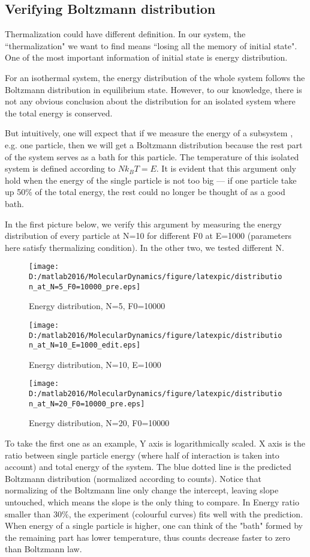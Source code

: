 \documentclass[aps,pre,twocolumn
,groupedaddress]{revtex4-1}
\begin{document}
\subsection{Verifying Boltzmann distribution}
Thermalization could have different definition. In our system, the ``thermalization" we want to find means ``losing all the memory of initial state". One of the most important information of initial state is energy distribution. 
 
For an isothermal system, the energy distribution of the whole system follows the Boltzmann distribution in equilibrium state. However, to our knowledge, there is not any obvious conclusion about the distribution for an isolated system where the total energy is conserved.

But intuitively, one will expect that if we measure the energy of a subsystem , e.g. one particle, then we will get a Boltzmann distribution because the rest part of the system serves as a bath for this particle. The temperature of this isolated system is defined according to $Nk_BT=E$. It is evident that this argument only hold when the energy of the single particle is not too big --- if one particle take up 50\% of the total energy, the rest could no longer be thought of as a good bath.

In the first picture below, we verify this argument by measuring the energy distribution of every particle at N=10 for different F0 at E=1000 (parameters here satisfy thermalizing condition). In the other two, we tested different N.

\newpage
\begin{figure}[hbtp]
\centering
\texttt{[image: D:/matlab2016/MolecularDynamics/figure/latexpic/distribution\_at\_N=5\_F0=10000\_pre.eps]}
\caption{Energy distribution, N=5, F0=10000}
\label{fig:thermalization8}

\texttt{[image: D:/matlab2016/MolecularDynamics/figure/latexpic/distribution\_at\_N=10\_E=1000\_edit.eps]}
\caption{Energy distribution, N=10, E=1000 {\color{red}{Run with N=10 F0=10000 to substitute this one}} }
\label{fig:thermalization9}

\texttt{[image: D:/matlab2016/MolecularDynamics/figure/latexpic/distribution\_at\_N=20\_F0=10000\_pre.eps]} 
\caption{Energy distribution, N=20, F0=10000}
\label{fig:thermalization10}
\end{figure}



To take the first one as an example, Y axis is logarithmically scaled. X axis is the ratio between single particle energy (where half of interaction is taken into account) and total energy of the system. The blue dotted line is the predicted Boltzmann distribution (normalized according to counts). Notice that normalizing of the Boltzmann line only change the intercept, leaving slope untouched, which means the slope is the only thing to compare. In  Energy ratio smaller than 30\%, the experiment (colourful curves) fits well with the prediction. When energy of a single particle is higher, one can think of the "bath" formed by the remaining part has lower temperature, thus counts decrease faster to zero than Boltzmann law.
\end{document}
